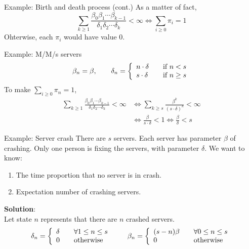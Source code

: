 \documentclass[mathserif]{beamer}
\begin{document}
\begin{frame}{Example: Birth and death process (cont.)}
As a matter of fact,
\[
\sum_{k\geq 1}\frac{\beta_0 \beta_1 \cdots \beta_{k-1}}{\delta_1 \delta_2 \cdots \delta_k} < \infty
\iff
\sum_{i\geq 0} \pi_i = 1
\]
Ohterwise, each $\pi_i$ would have value $0$.
\end{frame}

\begin{frame}{Example: M/M/s servers}
\[
\beta_n = \beta, \qquad \delta_n = \left\{
\begin{array}{l l}
n\cdot \delta & \quad\text{if } n < s \\
s\cdot \delta & \quad\text{if } n\geq s \\
\end{array}
\right.
\]
To make $\sum_{i\geq 0} \pi_n = 1$,
\begin{align*}
\sum_{k\geq 1}\frac{\beta_0 \beta_1 \cdots \beta_{k-1}}{\delta_1 \delta_2 \cdots \delta_k} < \infty
& \iff
\sum_{k\geq s}\frac{\beta^k}{(s\cdot \delta)^k} < \infty \\
& \iff 
\frac{\beta}{s\cdot \delta} < 1
\iff
\frac{\beta}{\delta} < s
\end{align*}
\end{frame}

\begin{frame}{Example: Server crash}
There are $s$ servers.
Each server has parameter $\beta$ of crashing.
Only one person is fixing the servers, with parameter $\delta$.
We want to know:
\begin{enumerate}
\item The time proportion that no server is in crash.
\item Expectation number of crashing servers.
\end{enumerate}
\vspace{\baselineskip}
\textbf{Solution}:\\
Let state $n$ represents that there are $n$ crashed servers.
\[
\delta_n = \left\{ 
\begin{array}{l l}
\delta & \quad\forall 1\leq n\leq s \\
0 & \quad\text{otherwise}
\end{array}
\right.
\qquad
\beta_n = \left\{
\begin{array}{l l}
(s - n)\beta & \quad\forall 0\leq n\leq s \\
0 & \quad\text{otherwise}
\end{array}
\right.
\]
\end{frame}
\end{document}

